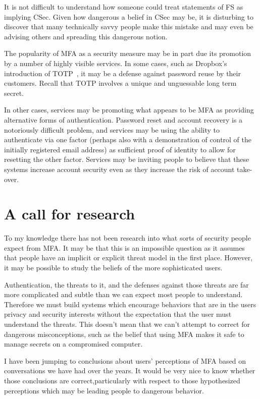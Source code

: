 \documentclass[12pt]{article}
\newcommand{\prop}[1]{\textsf{#1}}
\begin{document}
It is not difficult to understand how someone could treat statements of  \prop{FS} as implying  \prop{CSec}.
Given how dangerous a belief in \prop{CSec} may be, it is disturbing to discover that
many technically savvy people make this mistake and may even be advising others and spreading this dangerous notion.

The popularity of MFA as a security measure may be in part due its promotion by a number of highly visible services.
In some cases,
such as Dropbox's introduction of TOTP~\autocite{Dropbox12:reuse},
it may be a defense against password reuse by their customers.
Recall that TOTP involves a unique and unguessable long term secret.

In other cases, services may be promoting what appears to be MFA as providing
alternative forms of authentication. 
Password reset and account recovery is a notoriously difficult problem,
and services may be using the ability to authenticate via one factor 
(perhaps also with a demonstration of control of the initially registered email address)
as sufficient proof of identity to allow for resetting the other factor.
Services may be inviting people to believe that these systems increase account security even as they increase the risk of account take-over.

\section{A call for research}

To my knowledge there has not been research into what sorts of security people expect from MFA\@.
It may be that this is an impossible question as it assumes that people
have an implicit or explicit threat model in the first place.
However, it may be possible to study the beliefs of the more sophisticated users.

Authentication, the threats to it, and the defenses against those threats are far more complicated and subtle than we can expect most people to understand.
Therefore we must build systems which encourage behaviors that are in the users
privacy and security interests without the expectation that the user must understand the threats.
This doesn't mean that we can't attempt to correct for dangerous misconceptions,
such as the belief that using MFA makes it safe to manage secrets on a compromised computer.

I have been jumping to conclusions about users' perceptions of MFA based on 
conversations we have  had over the years.
It would be very nice to know  whether those conclusions are correct,particularly with respect to those hypothesized perceptions
which may be leading people to dangerous behavior.

\printbibliography
\end{document}
